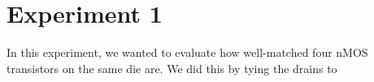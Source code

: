 \section*{Experiment 1}
In this experiment, we wanted to evaluate how well-matched four nMOS transistors on the same die are. We did this by tying the drains to 